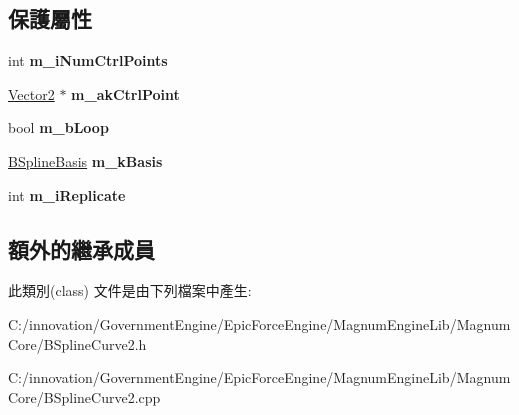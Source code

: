 \subsection*{保護屬性}
\begin{DoxyCompactItemize}
\item 
int {\bfseries m\+\_\+i\+Num\+Ctrl\+Points}\hypertarget{class_i_dream_sky_1_1_b_spline_curve2_a2eece9a7c3ea360634c5513294a27fd7}{}\label{class_i_dream_sky_1_1_b_spline_curve2_a2eece9a7c3ea360634c5513294a27fd7}

\item 
\hyperlink{class_i_dream_sky_1_1_vector2}{Vector2} $\ast$ {\bfseries m\+\_\+ak\+Ctrl\+Point}\hypertarget{class_i_dream_sky_1_1_b_spline_curve2_ada909c7268abadac94c21d5de9c6537a}{}\label{class_i_dream_sky_1_1_b_spline_curve2_ada909c7268abadac94c21d5de9c6537a}

\item 
bool {\bfseries m\+\_\+b\+Loop}\hypertarget{class_i_dream_sky_1_1_b_spline_curve2_a5acf3b20ece2f7ad51b06816b6841f8d}{}\label{class_i_dream_sky_1_1_b_spline_curve2_a5acf3b20ece2f7ad51b06816b6841f8d}

\item 
\hyperlink{class_i_dream_sky_1_1_b_spline_basis}{B\+Spline\+Basis} {\bfseries m\+\_\+k\+Basis}\hypertarget{class_i_dream_sky_1_1_b_spline_curve2_ab2a1ad1624c8c7196b2c3958cc0b138e}{}\label{class_i_dream_sky_1_1_b_spline_curve2_ab2a1ad1624c8c7196b2c3958cc0b138e}

\item 
int {\bfseries m\+\_\+i\+Replicate}\hypertarget{class_i_dream_sky_1_1_b_spline_curve2_a45fc425a9dd9414a3103efa0fa4b861a}{}\label{class_i_dream_sky_1_1_b_spline_curve2_a45fc425a9dd9414a3103efa0fa4b861a}

\end{DoxyCompactItemize}
\subsection*{額外的繼承成員}


此類別(class) 文件是由下列檔案中產生\+:\begin{DoxyCompactItemize}
\item 
C\+:/innovation/\+Government\+Engine/\+Epic\+Force\+Engine/\+Magnum\+Engine\+Lib/\+Magnum\+Core/B\+Spline\+Curve2.\+h\item 
C\+:/innovation/\+Government\+Engine/\+Epic\+Force\+Engine/\+Magnum\+Engine\+Lib/\+Magnum\+Core/B\+Spline\+Curve2.\+cpp\end{DoxyCompactItemize}

